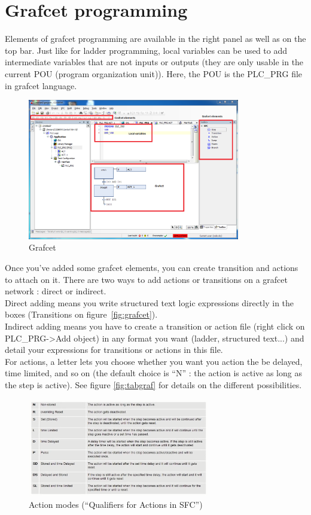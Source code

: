 \documentclass[10pt,a4paper]{article}
\begin{document}
\section{Grafcet programming}

Elements of grafcet programming are available in the right panel as well as on the top bar.
Just like for ladder programming, local variables can be used to add intermediate variables that are not inputs or outputs (they are only usable in the current POU (program organization unit)). Here, the POU is the PLC\_PRG file in grafcet language.

\begin{figure}[h!]
	\begin{center}
		\includegraphics[width=350px]{img13.PNG}
	\end{center}
\caption{Grafcet}
\label{fig:grafcet}
\end{figure}

Once you've added some grafcet elements, you can create transition and actions to attach on it.
There are two ways to add actions or transitions on a grafcet network : direct or indirect.\\
Direct adding means you write structured text logic expressions directly in the boxes (Transitions on figure~\vref{fig:grafcet}).\\
Indirect adding means you have to create a transition or action file (right click on PLC\_PRG->Add object) in any format you want (ladder, structured text...) and detail your expressions for transitions or actions in this file.\\
For actions, a letter lets you choose whether you want you action the be delayed, time limited, and so on (the default choice is ``N'' : the action is active as long as the step is active).
See figure \vref{fig:tabgraf} for details on the different possibilities.

\begin{figure}[h!]
	\begin{center}
		\includegraphics[width=300px]{tableaugrafcet.png}
	\end{center}
\caption{Action modes (``Qualifiers for Actions in SFC'')}
\label{fig:tabgraf}
\end{figure}
\end{document}
